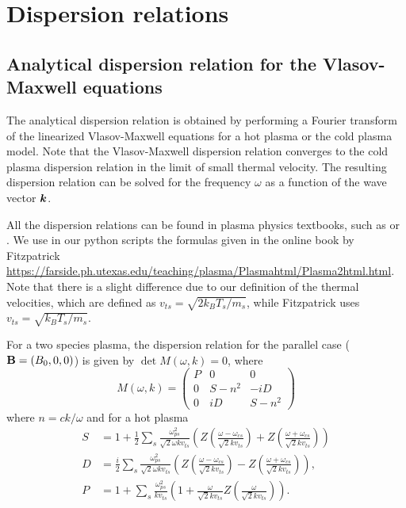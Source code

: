 \documentclass[11pt]{article}
\begin{document}
\section{Dispersion relations}

\subsection{Analytical dispersion relation for the Vlasov-Maxwell equations}

The analytical dispersion relation is obtained by performing a Fourier transform of the linearized Vlasov-Maxwell equations for a hot plasma or the cold plasma model.
Note that the Vlasov-Maxwell dispersion relation converges to the cold plasma dispersion relation in the limit of small thermal velocity. 
The resulting dispersion relation can be solved for the frequency $\omega$ as a function of the wave vector ${\boldsymbol k}$. 

All the dispersion relations can be found in plasma physics textbooks, such as \cite{swanson2020} or \cite{stix1992}. We use in our python scripts the formulas given in the online book by Fitzpatrick \url{https://farside.ph.utexas.edu/teaching/plasma/Plasmahtml/Plasma2html.html}. Note that there is a slight difference due to our definition of the thermal velocities, which are defined as $v_{ts} = \sqrt{2 k_B T_s / m_s}$, while Fitzpatrick uses $v_{ts} = \sqrt{k_B T_s / m_s}$.

For a two species plasma, the dispersion relation for the parallel case ($\mathbf{B} = (B_0, 0,0)$) is given by $\det M(\omega,k) = 0$, where
$$ M(\omega, k) = 
\begin{pmatrix}
    P & 0 & 0 \\
    0 & S-n^2 & -iD \\
    0 & iD & S-n^2
\end{pmatrix}$$
where $n = ck/\omega$ and for a hot plasma
\begin{align}
    S &= 1 + \frac12 \sum_s \frac{\omega_{ps}^2}{\sqrt{2}\omega k v_{ts}} 
    \left( Z\left(\frac{\omega-\omega_{cs}}{\sqrt{2}kv_{ts}}\right)
    + Z\left(\frac{\omega+\omega_{cs}}{\sqrt{2}kv_{ts}}\right) \right) \\ 
    D &= \frac{i}{2}\sum_s \frac{\omega_{ps}^2}{\sqrt{2}\omega k v_{ts}} 
    \left( Z\left(\frac{\omega-\omega_{cs}}{\sqrt{2}kv_{ts}}\right)
    - Z\left(\frac{\omega+\omega_{cs}}{\sqrt{2}kv_{ts}}\right) \right), \\ 
    P &= 1 + \sum_s \frac{\omega_{ps}^2}{ k v_{ts}} \left(
        1 + \frac{\omega}{\sqrt{2}kv_{ts}} Z\left(\frac{\omega}{\sqrt{2}kv_{ts}}\right)
    \right).
\end{align}
\end{document}
